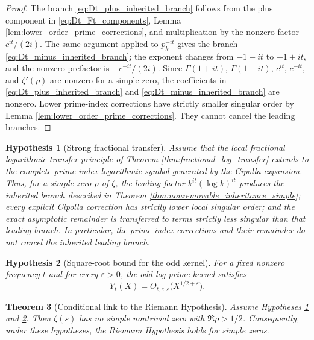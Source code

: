 \documentclass[11pt]{amsart}
\numberwithin{equation}{section}
\theoremstyle{plain}
\newtheorem{theorem}{Theorem}[section]
\newtheorem{hypothesis}[theorem]{Hypothesis}
\theoremstyle{definition}
\theoremstyle{remark}
\begin{document}
\begin{proof}
The branch \eqref{eq:Dt_plus_inherited_branch} follows from the plus
component in \eqref{eq:Dt_Ft_components}, Lemma
\ref{lem:lower_order_prime_corrections}, and multiplication by the
nonzero factor $c^{it}/(2i)$.
The same argument applied to $p_k^{-it}$ gives the branch
\eqref{eq:Dt_minus_inherited_branch}; the exponent changes from
$-1-it$ to $-1+it$, and the nonzero prefactor is $-c^{-it}/(2i)$.
Since $\Gamma(1+it)$, $\Gamma(1-it)$, $c^{it}$, $c^{-it}$, and
$\zeta'(\rho)$ are nonzero for a simple zero, the coefficients in
\eqref{eq:Dt_plus_inherited_branch} and
\eqref{eq:Dt_minus_inherited_branch} are nonzero.
Lower prime-index corrections have strictly smaller singular order by
Lemma \ref{lem:lower_order_prime_corrections}.  They cannot cancel the
leading branches.
\end{proof}


\begin{hypothesis}[Strong fractional transfer]
\label{H:strong}
Assume that the local fractional logarithmic transfer principle of
Theorem \ref{thm:fractional_log_transfer} extends to the complete
prime-index logarithmic symbol generated by the Cipolla expansion.  Thus,
for a simple zero $\rho$ of $\zeta$, the leading factor
$k^{it}(\log k)^{it}$ produces the inherited branch described in
Theorem \ref{thm:nonremovable_inheritance_simple}; every explicit Cipolla
correction has strictly lower local singular order; and the exact
asymptotic remainder is transferred to terms strictly less singular than
that leading branch.  In particular, the prime-index corrections and their
remainder do not cancel the inherited leading branch.
\end{hypothesis}

\begin{hypothesis}[Square-root bound for the odd kernel]
\label{H:bound}
For a fixed nonzero frequency $t$ and for every $\varepsilon>0$, the odd
log-prime kernel satisfies
\begin{equation}
Y_t(X)=O_{t,c,\varepsilon}\bigl(X^{1/2+\varepsilon}\bigr).
\label{eq:hypothesis_bound_Yt}
\end{equation}
\end{hypothesis}

\begin{theorem}[Conditional link to the Riemann Hypothesis]
\label{thm:conditional_link_RH}
Assume Hypotheses \ref{H:strong} and \ref{H:bound}.  Then $\zeta(s)$ has
no simple nontrivial zero with $\Re\rho>1/2$.  Consequently, under these
hypotheses, the Riemann Hypothesis holds for simple zeros.
\end{theorem}
\end{document}
